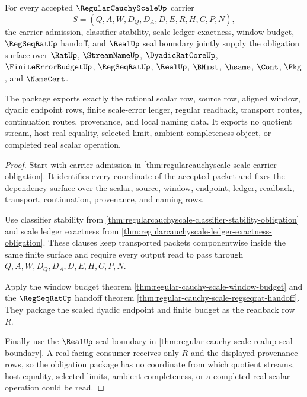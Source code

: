 \begin{theorem}
\label{thm:regular-cauchy-scale-obligation-scope-package}
For every accepted $\RegularCauchyScaleUp$ carrier
$$
S=(Q,A,W,D_Q,D_A,D,E,R,H,C,P,N),
$$
the carrier admission, classifier stability, scale ledger exactness, window budget, $\RegSeqRatUp$ handoff, and $\RealUp$ seal boundary jointly supply the obligation surface over $\RatUp$, $\StreamNameUp$, $\DyadicRatCoreUp$, $\FiniteErrorBudgetUp$, $\RegSeqRatUp$, $\RealUp$, $\BHist$, $\hsame$, $\Cont$, $\Pkg$, and $\NameCert$.

The package exports exactly the rational scalar row, source row, aligned window, dyadic endpoint rows, finite scale-error ledger, regular readback, transport routes, continuation routes, provenance, and local naming data. It exports no quotient stream, host real equality, selected limit, ambient completeness object, or completed real scalar operation.
\end{theorem}
\begin{proof}
Start with carrier admission in \autoref{thm:regularcauchyscale-scale-carrier-obligation}. It identifies every coordinate of the accepted packet and fixes the dependency surface over the scalar, source, window, endpoint, ledger, readback, transport, continuation, provenance, and naming rows.

Use classifier stability from \autoref{thm:regularcauchyscale-classifier-stability-obligation} and scale ledger exactness from \autoref{thm:regularcauchyscale-ledger-exactness-obligation}. These clauses keep transported packets componentwise inside the same finite surface and require every output read to pass through $Q,A,W,D_Q,D_A,D,E,H,C,P,N$.

Apply the window budget theorem \autoref{thm:regular-cauchy-scale-window-budget} and the $\RegSeqRatUp$ handoff theorem \autoref{thm:regular-cauchy-scale-regseqrat-handoff}. They package the scaled dyadic endpoint and finite budget as the readback row $R$.

Finally use the $\RealUp$ seal boundary in \autoref{thm:regular-cauchy-scale-realup-seal-boundary}. A real-facing consumer receives only $R$ and the displayed provenance rows, so the obligation package has no coordinate from which quotient streams, host equality, selected limits, ambient completeness, or a completed real scalar operation could be read.
\end{proof}

